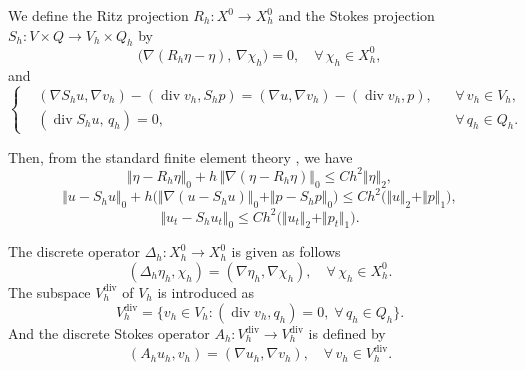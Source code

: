 \documentclass[a4paper,fleqn]{cas-sc}
\numberwithin{equation}{section}
\theoremstyle{definition}
\begin{document}
We define the Ritz projection
$R_{h}:X^{0}\to X^{0}_{h}$ and the Stokes projection
$S_{h}:V\times Q\to V_{h}\times Q_{h}$ by
\begin{equation}
  \bigl(\nabla(R_{h}\eta-\eta),\,\nabla\chi_{h}\bigr) = 0,
  \quad \forall\,\chi_{h}\in X^{0}_{h},
  \label{eq:2.18}
\end{equation}
and
\begin{equation}
  \left\{
  \begin{aligned}
    &(\nabla S_{h}u,\nabla v_{h}) - (\operatorname{div}v_{h},S_{h}p)
      = (\nabla u,\nabla v_{h}) - (\operatorname{div}v_{h},p),
      &&\forall\,v_{h}\in V_{h},\\
    &(\operatorname{div}S_{h}u,\,q_{h}) = 0,
      &&\forall\,q_{h}\in Q_{h}.
  \end{aligned}
  \right.
  \label{eq:2.19}
\end{equation}

Then, from the standard finite element theory \cite{John2016,Lin2006}, we have
\begin{equation}
  \Vert\eta - R_{h}\eta\Vert_{0}
  + h\,\Vert\nabla(\eta-R_{h}\eta)\Vert_{0}
  \le Ch^{2}\Vert\eta\Vert_{2},
  \label{eq:2.20}
\end{equation}
\begin{equation}
  \Vert u-S_{h}u\Vert_{0}
  + h\bigl(\Vert\nabla(u-S_{h}u)\Vert_{0}
    + \Vert p-S_{h}p\Vert_{0}\bigr)
  \le Ch^{2}\bigl(\Vert u\Vert_{2}+\Vert p\Vert_{1}\bigr),
  \label{eq:2.21}
\end{equation}
\begin{equation}
  \Vert u_{t} - S_{h}u_{t}\Vert_{0}
  \le Ch^{2}\bigl(\Vert u_{t}\Vert_{2}+\Vert p_{t}\Vert_{1}\bigr).
  \label{eq:2.22}
\end{equation}

The discrete operator $\Delta_{h}:X^{0}_{h}\to X^{0}_{h}$ is given as follows
\begin{equation}
  (\Delta_{h}\eta_{h},\chi_{h})
  = (\nabla\eta_{h},\nabla\chi_{h}),
  \quad \forall\,\chi_{h}\in X^{0}_{h}.
  \label{eq:2.23}
\end{equation}
The subspace $V_{h}^{\mathrm{div}}$ of $V_{h}$ is introduced as
\begin{equation}
  V_{h}^{\mathrm{div}}
  = \bigl\{v_{h}\in V_{h} :
    (\operatorname{div}v_{h},q_{h})=0,\;\forall\,q_{h}\in Q_{h}\bigr\}.
  \label{eq:2.24}
\end{equation}
And the discrete Stokes operator $A_{h}:V_{h}^{\mathrm{div}}\to V_{h}^{\mathrm{div}}$
is defined by
\begin{equation}
  (A_{h}u_{h},v_{h}) = (\nabla u_{h},\nabla v_{h}),
  \quad \forall\,v_{h}\in V_{h}^{\mathrm{div}}.
  \label{eq:2.25}
\end{equation}
\end{document}
